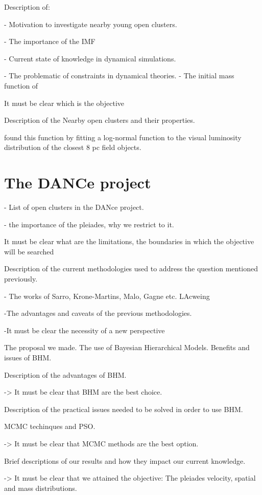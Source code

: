 Description of:

- Motivation to investigate nearby young open clusters.

- The importance of the IMF

- Current state of knowledge in dynamical simulations.

- The problematic of constraints in dynamical theories.
- The initial mass function of \citet{Chabrier2003,Chabrier2005,Thies2007}

It must be clear which is the objective

Description of the Nearby open clusters and their properties.


\citet{Chabrier2005} found this function by fitting a log-normal function to the visual luminosity distribution of the closest $8$ pc field objects.

\section{The DANCe project}

- List of open clusters in the DANce project.

- the importance of the pleiades, why we restrict to it.

It must be clear what are the limitations, the boundaries in which the objective will be searched

Description of the current methodologies used to address the question mentioned previously.

- The works of Sarro, Krone-Martins, Malo, Gagne etc. LAcweing

-The advantages and caveats of the previous methodologies. 

-It must be clear the necessity of a new perspective

The proposal we made. The use of Bayesian Hierarchical Models. Benefits and issues of BHM.

Description of the advantages of BHM.

-> It must be clear that BHM are the best choice.

Description of the practical issues needed to be solved in order to use BHM.

MCMC techinques and  PSO.

-> It must be clear that MCMC methods are the best option.

Brief descriptions of our results and how they impact our current knowledge.

-> It must be clear that we attained the objective: The pleiades velocity, spatial and mass distributions.
 



